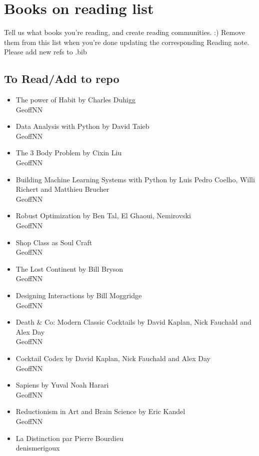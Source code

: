 
\section{Books on reading list}
Tell us what books you're reading, and create reading communities. :) Remove them from this list when you're done updating the corresponding Reading note. Please add new refs to .bib

\subsection{To Read/Add to repo}
\begin{itemize}
    \item The power of Habit by Charles Duhigg\\
    GeoffNN
    \item Data Analysis with Python by David Taieb \\
    GeoffNN
    \item The 3 Body Problem by Cixin Liu\\
    GeoffNN
    \item Building Machine Learning Systems with Python by Luis Pedro Coelho, Willi Richert and Matthieu Brucher \\
    GeoffNN
    \item Robust Optimization by Ben Tal, El Ghaoui, Nemirovski \\
    GeoffNN
    \item Shop Class as Soul Craft \\
    GeoffNN
    \item The Lost Continent by Bill Bryson \\
    GeoffNN
    \item Designing Interactions by Bill Moggridge \\
    GeoffNN
    \item Death \& Co: Modern Classic Cocktails by David Kaplan, Nick Fauchald and Alex Day \\
    GeoffNN
    \item Cocktail Codex by David Kaplan, Nick Fauchald and Alex Day \\
    GeoffNN
    \item Sapiens by Yuval Noah Harari \\
    GeoffNN
    \item Reductionism in Art and Brain Science by Eric Kandel \\
    GeoffNN
    \item La Distinction par Pierre Bourdieu \\
    denismerigoux
\end{itemize}
